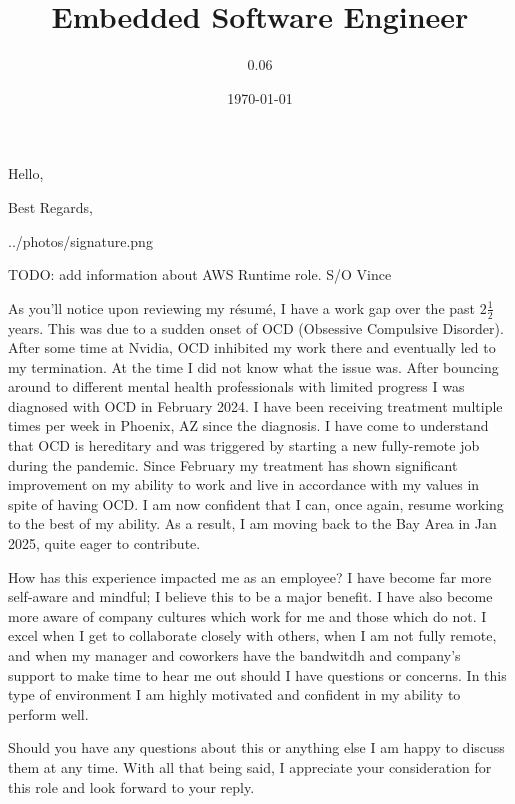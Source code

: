 \documentclass[11pt,a4paper,sans]{moderncv}        %
\title{Embedded Software Engineer}                               %
\begin{document}
\date{\today}
\subject{Sr. SDE, AWS Neuron Runtime}
\opening{Hello,}
\closing{Best Regards,}
\signature{0.06}{../photos/signature.png}                     %
\makelettertitle

TODO: add information about AWS Runtime role. S/O Vince

As you'll notice upon reviewing my r\'esum\'e, I have a work gap over the past $2\frac{1}{2}$ years. This was due to a sudden onset of OCD (Obsessive Compulsive Disorder). After some time at Nvidia, OCD inhibited my work there and eventually led to my termination. At the time I did not know what the issue was. After bouncing around to different mental health professionals with limited progress I was diagnosed with OCD in February 2024. I have been receiving treatment multiple times per week in Phoenix, AZ since the diagnosis. I have come to understand that OCD is hereditary and was triggered by starting a new fully-remote job during the pandemic. Since February my treatment has shown significant improvement on my ability to work and live in accordance with my values in spite of having OCD. I am now confident that I can, once again, resume working to the best of my ability. As a result, I am moving back to the Bay Area in Jan 2025, quite eager to contribute.

How has this experience impacted me as an employee? I have become far more self-aware and mindful; I believe this to be a major benefit. I have also become more aware of company cultures which work for me and those which do not. I excel when I get to collaborate closely with others, when I am not fully remote, and when my manager and coworkers have the bandwitdh and company's support to make time to hear me out should I have questions or concerns. In this type of environment I am highly motivated and confident in my ability to perform well.

Should you have any questions about this or anything else I am happy to discuss them at any time. With all that being said, I appreciate your consideration for this role and look forward to your reply.

\makeletterclosing

\end{document}
